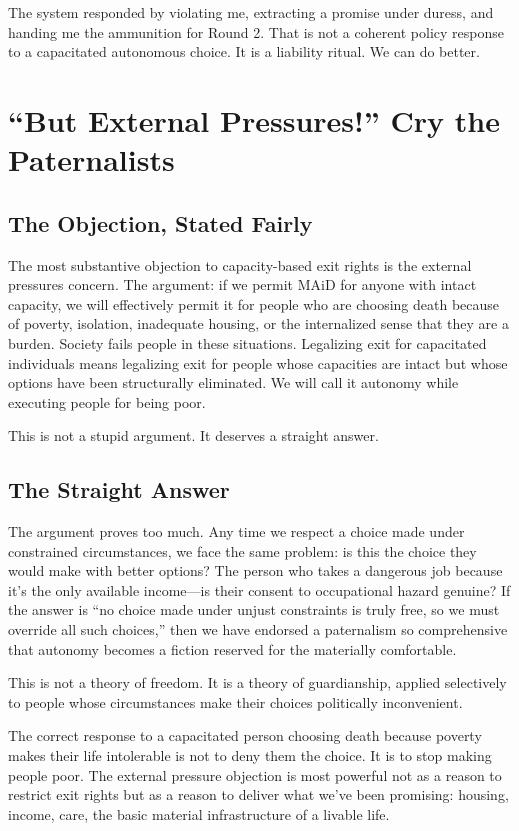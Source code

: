\documentclass[10pt, letterpaper, twocolumn]{article}
\begin{document}
The system responded by violating me, extracting a promise under duress, and handing me the ammunition for Round 2. That is not a coherent policy response to a capacitated autonomous choice. It is a liability ritual. We can do better.

\section{``But External Pressures!'' Cry the Paternalists}

\subsection{The Objection, Stated Fairly}

The most substantive objection to capacity-based exit rights is the external pressures concern. The argument: if we permit MAiD for anyone with intact capacity, we will effectively permit it for people who are choosing death because of poverty, isolation, inadequate housing, or the internalized sense that they are a burden. Society fails people in these situations. Legalizing exit for capacitated individuals means legalizing exit for people whose capacities are intact but whose options have been structurally eliminated. We will call it autonomy while executing people for being poor.

This is not a stupid argument. It deserves a straight answer.

\subsection{The Straight Answer}

The argument proves too much. Any time we respect a choice made under constrained circumstances, we face the same problem: is this the choice they would make with better options? The person who takes a dangerous job because it's the only available income---is their consent to occupational hazard genuine? If the answer is ``no choice made under unjust constraints is truly free, so we must override all such choices,'' then we have endorsed a paternalism so comprehensive that autonomy becomes a fiction reserved for the materially comfortable.

This is not a theory of freedom. It is a theory of guardianship, applied selectively to people whose circumstances make their choices politically inconvenient.

The correct response to a capacitated person choosing death because poverty makes their life intolerable is not to deny them the choice. It is to stop making people poor. The external pressure objection is most powerful not as a reason to restrict exit rights but as a reason to deliver what we've been promising: housing, income, care, the basic material infrastructure of a livable life.
\end{document}
